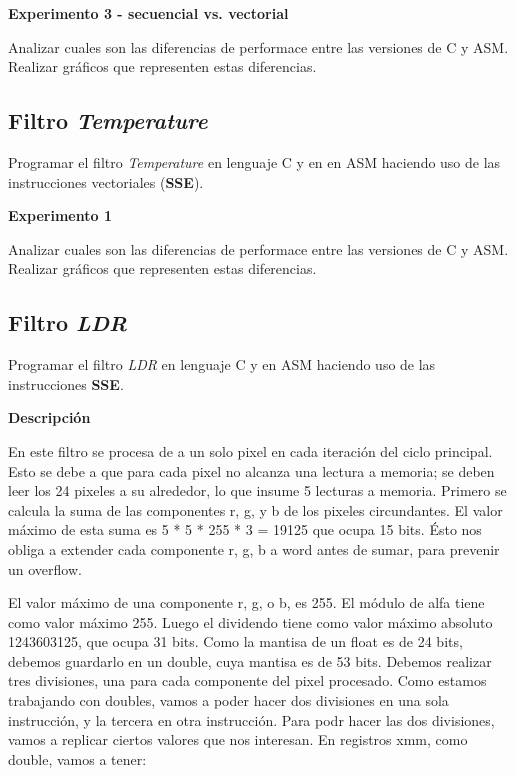 \vspace*{0.3cm} \noindent
\textbf{Experimento 3 - secuencial vs. vectorial}

  Analizar cuales son las diferencias de performace entre las versiones de C y ASM. 
  Realizar gráficos que representen estas diferencias.


\subsection*{Filtro \textit{Temperature}}

  Programar el filtro \textit{Temperature} en lenguaje C y en en ASM haciendo uso de 
  las instrucciones vectoriales (\textbf{SSE}).


\vspace*{0.3cm} \noindent
\textbf{Experimento 1}

  Analizar cuales son las diferencias de performace entre las versiones de C y ASM. 
  Realizar gráficos que representen estas diferencias.



\subsection*{Filtro \textit{LDR}}
  Programar el filtro \textit{LDR} en lenguaje C y en
  ASM haciendo uso de las instrucciones \textbf{SSE}.

\vspace*{0.3cm} \noindent
\textbf{Descripción}

En este filtro se procesa de a un solo pixel en cada iteración del ciclo principal. Esto se debe a que para cada pixel no alcanza una lectura a
memoria; se deben leer los 24 pixeles a su alrededor, lo que insume 5 lecturas a memoria.
Primero se calcula la suma de las componentes r, g, y b de los pixeles circundantes. El valor máximo de esta suma es 5 * 5 * 255 * 3 = 19125 que 
ocupa 15 bits. Ésto nos obliga a extender cada componente r, g, b a word antes de sumar, para prevenir un overflow.

El valor máximo de una componente r, g, o b, es 255. El módulo de alfa tiene como valor máximo 255. Luego el dividendo tiene como valor máximo
absoluto 1243603125, que ocupa 31 bits. Como la mantisa de un float es de 24 bits, debemos guardarlo en un double, cuya mantisa es de 53 bits.
Debemos realizar tres divisiones, una para cada componente del pixel procesado. Como estamos trabajando con doubles, vamos a poder hacer dos
divisiones en una sola instrucción, y la tercera en otra instrucción. Para podr hacer las dos divisiones, vamos a replicar ciertos valores 
que nos interesan. 
En registros xmm, como double, vamos a tener:

